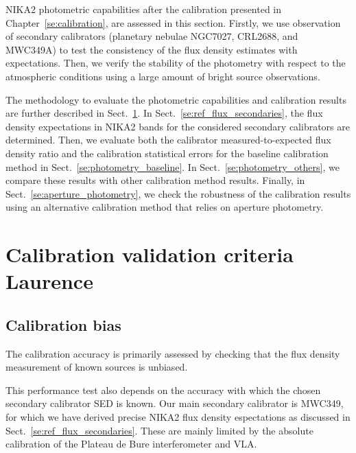 
NIKA2 photometric capabilities after the calibration presented in
Chapter~\ref{se:calibration}, are assessed in this section. Firstly,
we use observation of secondary calibrators (planetary nebulae NGC7027, CRL2688, and
MWC349A) to test the consistency of the flux density estimates with
expectations. Then, we verify the stability of the photometry with
respect to the atmospheric conditions using a large amount of bright
source observations.


The methodology to evaluate the photometric
capabilities and calibration results are further described in
Sect.~\ref{se:photometry_criteria}.
In Sect.~\ref{se:ref_flux_secondaries}, the flux density expectations
in NIKA2 bands for the considered secondary calibrators are
determined. Then, we evaluate both the calibrator measured-to-expected
flux density ratio and the calibration statistical errors for the
baseline calibration method in Sect.~\ref{se:photometry_baseline}. 
In Sect.~\ref{se:photometry_others}, we compare these results with other
calibration method results. 
Finally, in Sect.~\ref{se:aperture_photometry}, we check the robustness of the calibration
results using an alternative calibration method that relies on
aperture photometry.

\section{Calibration validation criteria {\color{LimeGreen} Laurence}}
\label{se:photometry_criteria}

\subsection{Calibration bias}
The calibration accuracy is primarily assessed by checking
that the flux density measurement of known sources is unbiased.

This performance test also depends on the accuracy with which the
chosen secondary calibrator SED is known. Our main secondary
calibrator is MWC349, for which we have derived precise NIKA2 flux
density espectations as discussed in
Sect.~\ref{se:ref_flux_secondaries}.
These are mainly limited by the absolute calibration of the Plateau de
Bure interferometer and VLA.

